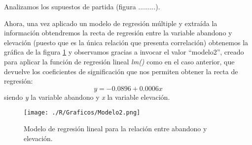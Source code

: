 \documentclass[11pt,a4paper]{article}
\begin{document}
Analizamos los supuestos de partida (figura .........).

Ahora, una vez aplicado un modelo de regresión múltiple y extraída la información obtendremos la recta de regresión entre la variable abandono y elevación (puesto que es la única relación que presenta correlación) obtenemos la gráfica de la figura \ref{fig:lm2} y observamos gracias a invocar el valor ``modelo2'', creado para aplicar la función de regresión lineal \textit{lm()} como en el caso anterior, que devuelve los coeficientes de significación que nos permiten obtener la recta de regresión:
\begin{equation}
y=-0.0896+0.0006x
\label{eq:regre.elev}
\end{equation}
\noindent siendo \textit{y} la variable abandono y \textit{x} la variable elevación.

\begin{figure}
	\centering
	\texttt{[image: ./R/Graficos/Modelo2.png]}
	\caption{Modelo de regresión lineal para la relación entre abandono y elevación.}
	\label{fig:lm2}
\end{figure}
\end{document}
